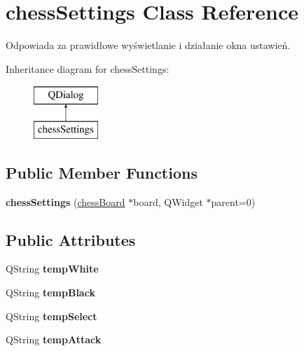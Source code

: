 \hypertarget{classchess_settings}{}\section{chess\+Settings Class Reference}
\label{classchess_settings}


Odpowiada za prawidłowe wyświetlanie i działanie okna ustawień.  


Inheritance diagram for chess\+Settings\+:\begin{figure}[H]
\begin{center}
\leavevmode
\includegraphics[height=2.000000cm]{classchess_settings}
\end{center}
\end{figure}
\subsection*{Public Member Functions}
\begin{DoxyCompactItemize}
\item 
\mbox{\label{classchess_settings_a9b9804678d875a994ec7948c2eff9154}} 
{\bfseries chess\+Settings} (\hyperlink{classchess_board}{chess\+Board} $\ast$board, Q\+Widget $\ast$parent=0)
\end{DoxyCompactItemize}
\subsection*{Public Attributes}
\begin{DoxyCompactItemize}
\item 
\mbox{\label{classchess_settings_a8175026258f6aff812f8c57ad076c00b}} 
Q\+String {\bfseries temp\+White}
\item 
\mbox{\label{classchess_settings_a3ac3ceb3f0488724d5483c1dfadf358a}} 
Q\+String {\bfseries temp\+Black}
\item 
\mbox{\label{classchess_settings_a1ca15b3fd765819f7227332999a79244}} 
Q\+String {\bfseries temp\+Select}
\item 
\mbox{\label{classchess_settings_a0fac91652a3084376ca48fcd37b1100e}} 
Q\+String {\bfseries temp\+Attack}
\end{DoxyCompactItemize}


